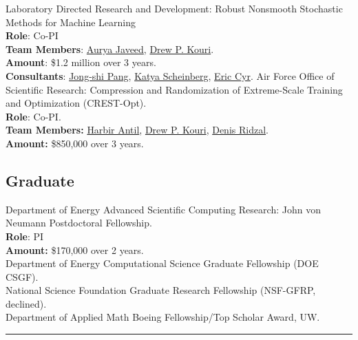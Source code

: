 \documentclass[12pt, a4paper]{article}
\newcommand{\years}[1]{\marginnote{#1}}
\begin{document}
\noindent
\years{2023} Laboratory Directed Research and Development: Robust Nonsmooth Stochastic Methods for Machine Learning\\
\textbf{Role}: Co-PI \\
\textbf{Team Members}: \href{https://rol.sandia.gov/team/}{Aurya Javeed},
\href{https://cfwebprod.sandia.gov/cfdocs/CompResearch/templates/insert/profile.cfm?dpkouri}{Drew P. Kouri}.\\
\textbf{Amount}: \$1.2 million over 3 years.\\
\textbf{Consultants}: \href{https://viterbi.usc.edu/directory/faculty/Pang/Jong-Shi}{Jong-shi Pang}, \href{https://www.orie.cornell.edu/faculty-directory/katya-scheinberg}{Katya Scheinberg}, \href{https://www.sandia.gov/ccr/staff/eric-christopher-cyr/}{Eric Cyr}.
\noindent
\years{2022} Air Force Office of Scientific Research: Compression and Randomization of Extreme-Scale Training and Optimization (CREST-Opt).\\
\textbf{Role}: Co-PI.\\
 \textbf{Team Members:}
\href{https://math.gmu.edu/~hantil/}{Harbir Antil},
\href{https://cfwebprod.sandia.gov/cfdocs/CompResearch/templates/insert/profile.cfm?dpkouri}{Drew P. Kouri},
\href{https://cfwebprod.sandia.gov/cfdocs/CompResearch/templates/insert/profile.cfm?dridzal}{Denis Ridzal}.\\
 \textbf{Amount:} \$850,000 over 3 years.\\
\subsection*{Graduate}
\years{2021} Department of Energy Advanced Scientific Computing Research: John von Neumann Postdoctoral Fellowship.\\
\textbf{Role}: PI \\
\textbf{Amount:} \$170,000 over 2 years. \\
\years{2017-21} Department of Energy Computational Science Graduate Fellowship (DOE CSGF).\\
\years{2017} National Science Foundation Graduate Research Fellowship (NSF-GFRP, declined). \\
\years{2016} Department of Applied Math Boeing Fellowship/Top Scholar Award, UW. \\
\hrule
\end{document}
